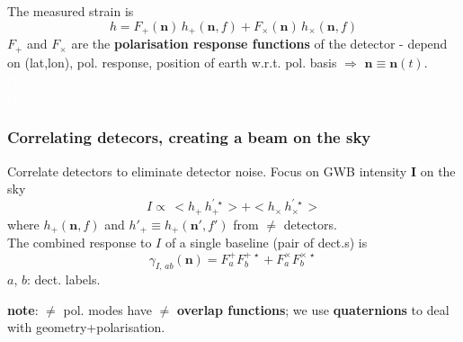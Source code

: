 \begin{frame}
\begin{columns}[b]
	\end{columns}
    \centering
    The measured strain is 
    \begin{equation}
    h = F_+(\bm{n}) \, h_+(\bm{n},f) + F_\times(\bm{n}) \, h_\times(\bm{n},f) 
        \end{equation}
	  \flushleft
      \footnotesize 
     $F_+$ and $F_\times$ are the \textbf{polarisation response functions} of the detector - depend on (lat,lon), pol. response, position of 		earth w.r.t. pol. basis $\Rightarrow$ $\bm{n} \equiv \bm{n}(t)$.\\
     \textcolor{white}{filler}\\
     \textcolor{white}{filler}

\end{frame}

\begin{frame}
	\normalsize
	\frametitle{Correlating detecors, creating a beam on the sky}
		Correlate detectors to eliminate detector noise. Focus on GWB intensity $\bm{I}$ on the sky\\
    	$$I \propto \, <h_+\,h_{+}^{'\,\star}> + <h_\times\,h_{\times}^{'\,\star}>$$
        where $h_+(\bm{n}, f)$ and $h'_+\equiv h_+(\bm{n'}, f')$ from $\neq$ detectors.\\
        \medskip
        The combined response to $I$ of a single baseline (pair of dect.s) is
        \begin{equation}
        \gamma_{I,\,ab} (\bm{n}) =F^+_aF^{+\,\star}_b+F^\times_aF^{\times\,\star}_b\,
        \end{equation}
        $a$, $b$: dect. labels.\\
        \medskip
        
        \textbf{note}: $\neq$ pol. modes have $\neq$ \textbf{overlap functions}; we use \textbf{quaternions} to deal with geometry+polarisation.
    
\end{frame}


